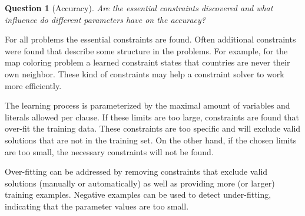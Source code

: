 \documentclass[letterpaper]{article}
\newtheorem{question}{Question}
\theoremstyle{definition}
\begin{document}
\begin{question}[Accuracy]
  Are the essential constraints discovered and what influence do different parameters have on the accuracy?
\end{question}
For all problems the essential constraints are found.
Often additional constraints were found that describe some structure in the problems.
For example, for the map coloring problem a learned constraint states that countries are never their own neighbor.
These kind of constraints may help a constraint solver to work more efficiently.

The learning process is parameterized by the maximal amount of variables and literals allowed per clause.
If these limits are too large, constraints are found that over-fit the training data.
These constraints are too specific and will exclude valid solutions that are not in the training set.
On the other hand, if the chosen limits are too small, the necessary constraints will not be found.

Over-fitting can be addressed by removing constraints that exclude valid solutions (manually or automatically) as well as providing more (or larger) training examples.
Negative examples can be used to detect under-fitting, indicating that the parameter values are too small.
\end{document}
